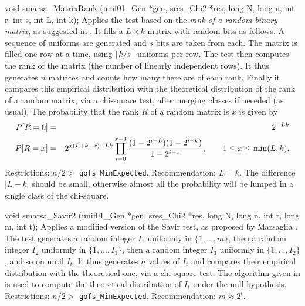 void smarsa_MatrixRank (unif01_Gen *gen, sres_Chi2 *res,
                        long N, long n, int r, int s, int L, int k);
\endcode
 \tab
  Applies the test based on the {\em rank of a random binary matrix\/},
  as
  suggested in \cite {rMAR85a,rMAR85b}.
  It fills a $L\times k$  matrix with  random bits  as follows.
  A sequence of uniforms are generated and $s$ bits are taken from each.
  The matrix is filled one row at a time, using
  $\lceil k/s\rceil$ uniforms per row. 
  The test then computes the rank of the matrix 
  (the number of linearly independent rows).
  It thus generates $n$ matrices and counts how many
  there are of each rank. 
  Finally it  compares this  empirical  distribution
  with the theoretical distribution of the rank of a random matrix,
  via a chi-square test, after merging classes if neeeded (as usual).
  The probability that the rank $R$ of a random matrix is $x$ is given by
  \begin{eqnarray*}
   P[R=0] & =& {2^{-Lk}} \\
   P[R=x] & =& 2^{x(L+k-x)-Lk} \prod_{i=0}^{x-1}
               { (1-2^{i-L})(1-2^{i-k}) \over 1-2^{i-x} },
                  \qquad 1 \le x \le \min (L, k).
  \end{eqnarray*}
  Restrictions:  $n/2 > $ {\tt gofs\_MinExpected}.  Recommendation: $L = k$.
  The difference $|L - k|$ should be small, otherwise almost all the
  probability will be lumped in a single class of the chi-square.
 \endtab
\code


void smarsa_Savir2 (unif01_Gen *gen, sres_Chi2 *res,
                    long N, long n, int r, long m, int t);
\endcode
 \tab
  Applies a modified version of the Savir test, as proposed by
  Marsaglia \cite{rMAR85c}.
  The test generates a random integer $I_1$ uniformly in $\{1,\dots,m\}$,
  then a random integer $I_2$ uniformly in $\{1,\dots,I_1\}$,
  then a random integer $I_3$ uniformly in $\{1,\dots,I_2\}$,
  and so on until $I_t$.
  It thus generates $n$ values of $I_t$ and compares their empirical
  distribution with the theoretical one, via a chi-square test.
  The algorithm given in \cite{rMAR85c} is used to compute the
  theoretical distribution of $I_t$ under the null hypothesis.
  Restrictions:   $n/2 > $ {\tt gofs\_MinExpected}.
  Recommendation: $m \approx 2^t$.
 \endtab
\code


